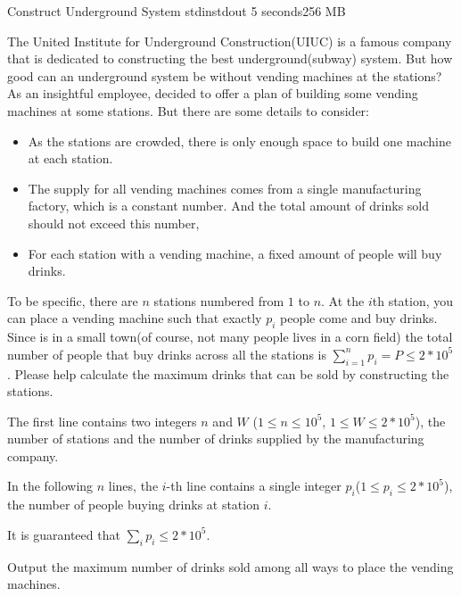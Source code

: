 \begin{problem}{Construct Underground System}
{stdin}{stdout}
{5 seconds}{256 MB}{}

The United Institute for Underground Construction(UIUC) is a famous company that is dedicated to constructing the best underground(subway) system. But how good can an underground system be without vending machines at the stations? As an insightful employee, \pittoresque decided to offer a plan of building some vending machines at some stations. But there are some details to consider:
\begin{itemize}
    \item As the stations are crowded, there is only enough space to build one machine at each station.
    \item The supply for all vending machines comes from a single manufacturing factory, which is a constant number. And the total amount of drinks sold should not exceed this number,
    \item For each station with a vending machine, a fixed amount of people will buy drinks.
\end{itemize}

To be specific, there are $n$ stations numbered from $1$ to $n$. At the $i$th station, you can place a vending machine such that exactly $p_i$ people come and buy drinks. Since \pittoresque is in a small town(of course, not many people lives in a corn field) the total number of people that buy drinks across all the stations is $\sum_{i=1}^n p_i = P \leq 2 * 10^5$. Please help \pittoresque calculate the maximum drinks that can be sold by constructing the stations.

\InputFile

The first line contains two integers $n$ and $W$ ($1 \le n \le 10^5$, $1 \le W \le 2 * 10^5$), the number of stations and the number of  drinks supplied by the manufacturing company.

In the following $n$ lines, the $i$-th line contains a single integer $p_i$($1 \le p_i \le 2 * 10^5$), the number of people buying drinks at station $i$.

It is guaranteed that $\sum_i p_i \leq 2 * 10^5$.

\OutputFile

Output the maximum number of drinks sold among all ways to place the vending machines.

\Examples

\begin{example}
%
\end{example}

\begin{example}
%
\end{example}



\end{problem}
